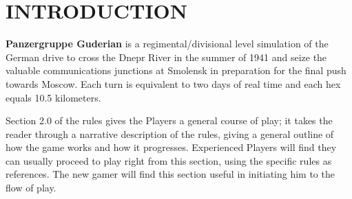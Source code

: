 \section{INTRODUCTION}

\textbf{Panzergruppe Guderian} is a regimental/divisional level simulation of the German drive to cross the Dnepr River in the summer of 1941 and seize the valuable communications junctions at Smolensk in preparation for the final push towards Moscow. Each turn is equivalent to two days of real time and each hex equals 10.5 kilometers.
\par
Section 2.0 of the rules gives the Players a general course of play; it takes the reader through a narrative description of the rules, giving a general outline of how the game works and how it progresses. Experienced Players will find they can usually proceed to play right from this section, using the specific rules as references. The new gamer will find this section useful in initiating him to the flow of play.